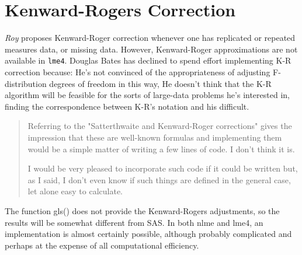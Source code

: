 \documentclass[Chap4amain.tex]{subfiles}
\begin{document}
\newpage
\section{Kenward-Rogers Correction}

\textit{Roy} proposes Kenward-Roger correction whenever one has replicated or repeated measures data, or missing data.
However, Kenward-Roger approximations are not available in \texttt{lme4}. Douglas Bates has declined to spend effort implementing K-R correction because:
He's not convinced of the appropriateness of adjusting F-distribution degrees of freedom in this way, He doesn't think that the K-R algorithm will be feasible for the sorts of large-data problems he's interested in,
finding the correspondence between K-R's notation and his difficult.

\begin{quotation}
Referring to the "Satterthwaite and Kenward-Roger corrections" gives
 the impression that these are well-known formulas and implementing
 them would be a simple matter of writing a few lines of code.  I don't
 think it is. 
 
I would be very pleased to incorporate such code if it  could be written but, as I said, I don't even know if such things are defined in the general case, let alone easy to calculate.

\end{quotation}

The function gls() does not provide the Kenward-Rogers adjustments, so the results will be somewhat different from SAS.
In both nlme and lme4, an implementation is almost certainly possible, although probably complicated and perhaps at the expense of all computational efficiency.
\end{document}
